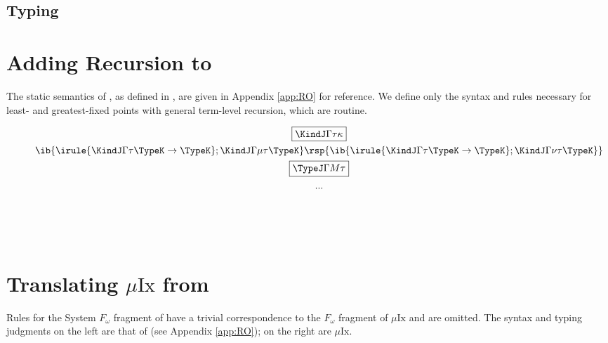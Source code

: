 \documentclass[12pt]{article}
\newcommand\Ix{\mathrm{Ix}}
\newcommand\MuIx{\ensuremath{\mu\Ix}}
\begin{document}
\subsection{Typing}
\label{sec:Typing}

\section{Adding Recursion to \RO}

The static semantics of \RO, as defined in \cite{HubersM23}, are given in Appendix \ref{app:RO} for reference. We define only the syntax and rules necessary for least- and greatest-fixed points with general term-level recursion, which are routine.

\begin{figure}[H]
\begin{gather*}
\fbox{$\KindJ \Gamma \tau \kappa$} 
\\
{\ib{\irule
          {\KindJ \Gamma \tau {\TypeK \to \TypeK}};
          {\KindJ \Gamma {\mu \tau} {\TypeK}}}}
\rsp
{\ib{\irule
          {\KindJ \Gamma \tau {\TypeK \to \TypeK}};
          {\KindJ \Gamma {\nu \tau} {\TypeK}}}}
\\
\fbox{$\TypeJ \Gamma M \tau$} \\
...
\vspace{5em}
\end{gather*}
\end{figure}

\section{Translating \MuIx{} from \RO}
\label{sec:Translation}

Rules for the System $F_{\omega}$ fragment of \RO have a trivial correspondence to the $F_{\omega}$ fragment of \MuIx{} and are omitted. The syntax and typing judgments on the left are that of \RO (see Appendix \ref{app:RO}); on the right are \MuIx.
\end{document}
